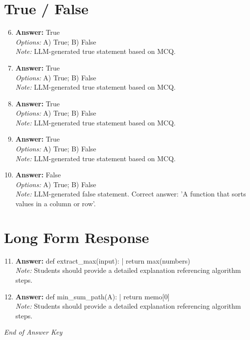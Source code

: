 \documentclass[12pt]{article}
\begin{document}
\section*{True / False}
\begin{enumerate}[label=\arabic*.]
\setcounter{enumi}{5}
\item \textbf{Answer:} True
\\ \textit{Options:} A) True; B) False
\\ \textit{Note:} LLM-generated true statement based on MCQ.
\item \textbf{Answer:} True
\\ \textit{Options:} A) True; B) False
\\ \textit{Note:} LLM-generated true statement based on MCQ.
\item \textbf{Answer:} True
\\ \textit{Options:} A) True; B) False
\\ \textit{Note:} LLM-generated true statement based on MCQ.
\item \textbf{Answer:} True
\\ \textit{Options:} A) True; B) False
\\ \textit{Note:} LLM-generated true statement based on MCQ.
\item \textbf{Answer:} False
\\ \textit{Options:} A) True; B) False
\\ \textit{Note:} LLM-generated false statement. Correct answer: 'A function that sorts values in a column or row'.
\end{enumerate}

\section*{Long Form Response}
\begin{enumerate}[label=\arabic*.]
\setcounter{enumi}{10}
\item \textbf{Answer:} def extract\_max(input): | return max(numbers)
\\ \textit{Note:} Students should provide a detailed explanation referencing algorithm steps.
\item \textbf{Answer:} def min\_sum\_path(A): | return memo[0]
\\ \textit{Note:} Students should provide a detailed explanation referencing algorithm steps.
\end{enumerate}

\vfill
\noindent\textit{End of Answer Key}
\end{document}
